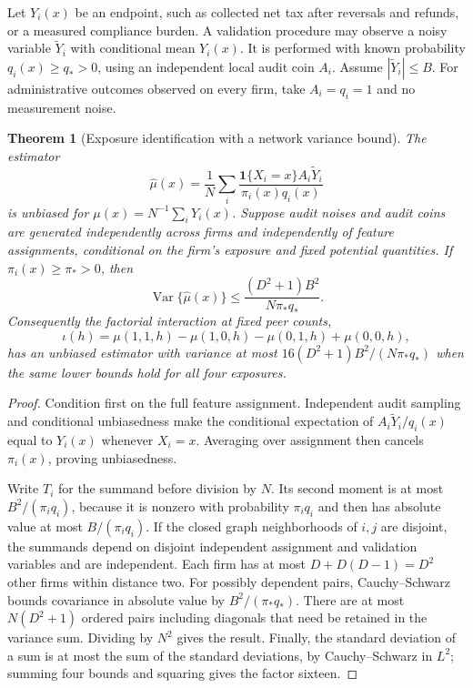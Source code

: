\documentclass[11pt,a4paper]{article}
\newtheorem{theorem}{Theorem}[section]
\theoremstyle{definition}
\theoremstyle{remark}
\newcommand{\ind}{\mathbf 1}
\newcommand{\Var}{\operatorname{Var}}
\begin{document}
Let $Y_i(x)$ be an endpoint, such as collected net tax after reversals and refunds, or a measured compliance burden. A validation procedure may observe a noisy variable $\widetilde Y_i$ with conditional mean $Y_i(x)$. It is performed with known probability $q_i(x)\geq q_*>0$, using an independent local audit coin $A_i$. Assume $|\widetilde Y_i|\leq B$. For administrative outcomes observed on every firm, take $A_i=q_i=1$ and no measurement noise.

\begin{theorem}[Exposure identification with a network variance bound]\label{th:ht}
The estimator
\[
 \widehat\mu(x)=\frac1N\sum_i
 \frac{\ind\{X_i=x\}A_i\widetilde Y_i}{\pi_i(x)q_i(x)}
\]
is unbiased for $\mu(x)=N^{-1}\sum_iY_i(x)$. Suppose audit noises and audit coins are generated independently across firms and independently of feature assignments, conditional on the firm's exposure and fixed potential quantities. If $\pi_i(x)\geq\pi_*>0$, then
\[
 \Var\{\widehat\mu(x)\}
 \leq\frac{(D^2+1)B^2}{N\pi_*q_*}.
\]
Consequently the factorial interaction at fixed peer counts,
\[
 \iota(h)=\mu(1,1,h)-\mu(1,0,h)-\mu(0,1,h)+\mu(0,0,h),
\]
has an unbiased estimator with variance at most
$16(D^2+1)B^2/(N\pi_*q_*)$ when the same lower bounds hold for all four exposures.
\end{theorem}
\begin{proof}
Condition first on the full feature assignment. Independent audit sampling and conditional unbiasedness make the conditional expectation of $A_i\widetilde Y_i/q_i(x)$ equal to $Y_i(x)$ whenever $X_i=x$. Averaging over assignment then cancels $\pi_i(x)$, proving unbiasedness.

Write $T_i$ for the summand before division by $N$. Its second moment is at most $B^2/(\pi_iq_i)$, because it is nonzero with probability $\pi_iq_i$ and then has absolute value at most $B/(\pi_iq_i)$. If the closed graph neighborhoods of $i,j$ are disjoint, the summands depend on disjoint independent assignment and validation variables and are independent. Each firm has at most $D+D(D-1)=D^2$ other firms within distance two. For possibly dependent pairs, Cauchy--Schwarz bounds covariance in absolute value by $B^2/(\pi_*q_*)$. There are at most $N(D^2+1)$ ordered pairs including diagonals that need be retained in the variance sum. Dividing by $N^2$ gives the result. Finally, the standard deviation of a sum is at most the sum of the standard deviations, by Cauchy--Schwarz in $L^2$; summing four bounds and squaring gives the factor sixteen.
\end{proof}
\end{document}
